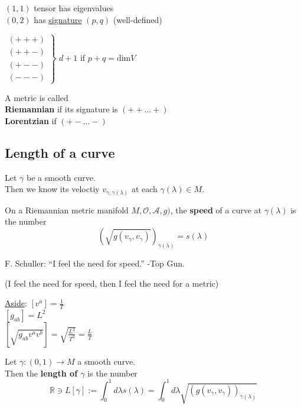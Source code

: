 	$(1,1)$ tensor has eigenvalues \\
	$(0,2)$ has \underline{signature} $(p,q)$ (well-defined)
	
	$\left. \begin{aligned}
	(+++) \\
	(++-) \\
	(+--) \\
	(---) \end{aligned} \right\rbrace$ $d+1$ if $p+q = \text{dim}V$
	
	
	\begin{definition} A metric is called  \\
		\textbf{Riemannian} if its signature is $(++ \dots +)$ \\
		\textbf{Lorentzian} if $(+-\dots -)$ 
	\end{definition}
	
	
	\subsection{Length of a curve}
	
	Let $\gamma$ be a smooth curve. \\
	Then we know its veloctiy $v_{\gamma, \gamma(\lambda)}$ at each $\gamma(\lambda) \in M$.  
	
	\begin{definition}
		On a Riemannian metric manifold $M, \mathcal{O},\mathcal{A},g)$, the \textbf{speed} of a curve at $\gamma(\lambda)$ is the number 
		\[
		(\sqrt{ g(v_{\gamma}, v_{\gamma}) })_{\gamma(\lambda)} = s(\lambda)
		\]
	\end{definition}
	
	F. Schuller: ``I feel the need for speed.'' -Top Gun.  
	
	(I feel the need for speed, then I feel the need for a metric)
	
	\underline{Aside}: $[v^a] = \frac{1}{T}$ \\
	\phantom{Aside:} $[g_{ab}] = L^2 $ \\
	\phantom{Aside:} $[\sqrt{g_{ab}v^av^b}] = \sqrt{ \frac{L^2}{T^2}} = \frac{L}{T}$
	
	\begin{definition}
		Let $\gamma:(0,1) \to M$ a smooth curve.  \\
		Then the \textbf{length of $\gamma$} is the number 
		\[
		\mathbb{R} \ni L[\gamma] := \int_0^1 d\lambda s(\lambda) = \int_0^1 d\lambda \sqrt{ (g(v_{\gamma}, v_{\gamma}))_{\gamma(\lambda)}}
		\]
	\end{definition}
	
